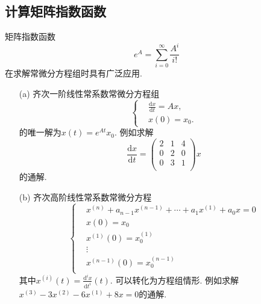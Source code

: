 \subsection{计算矩阵指数函数}
矩阵指数函数$$e^{A} = \sum_{i=0}^{\infty} \frac{A^i}{i!}$$
在求解常微分方程组时具有广泛应用.
    \begin{itemize}
        \item [(a)]齐次一阶线性常系数常微分方程组
        \begin{equation}
        \nonumber
        \left\{
        \begin{aligned}
        &\frac{\mathrm{d} x}{\mathrm{d} t} = Ax,\\
        &x(0) = x_0.
        \end{aligned}
        \right.
        \end{equation}
        的唯一解为$x(t)=e^{At}x_0$. 例如求解
        \begin{equation}
            \nonumber
            \frac{\mathrm{d} x}{\mathrm{d} t} = 
            \begin{pmatrix}
                2& 1& 4\\
                0& 2& 0\\
                0& 3& 1\\
            \end{pmatrix}
            x
        \end{equation}
        的通解.
        \vspace{3cm}
        \item [(b)]齐次高阶线性常系数常微分方程
        \begin{equation}
        \nonumber
        \left\{
        \begin{aligned}
        &x^{(n)} + a_{n-1} x^{(n-1)} + \cdots + a_1 x^{(1)} + a_0 x = 0\\
        &x(0) = x_0\\
        &x^{(1)}(0) = x_0^{(1)}\\
        &\vdots\\
        &x^{(n-1)}(0) = x_0^{(n-1)}\\
        \end{aligned}
        \right.
        \end{equation}
        其中$x^{(i)}(t) = \frac{\mathrm{d}^i x}{\mathrm{d} t^i}(t).$ 可以转化为方程组情形.
        例如求解$x^{(3)} - 3x^{(2)}-6x^{(1)} + 8x = 0$的通解.
        \vspace{3cm}
    \end{itemize}

